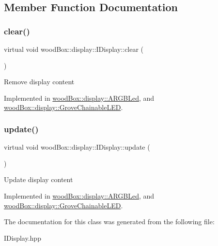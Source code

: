 \subsection{Member Function Documentation}
\mbox{\label{classwood_box_1_1display_1_1_i_display_a7030f0768c1ef15ce936a259406168dc}} 
\subsubsection{\texorpdfstring{clear()}{clear()}}
{\footnotesize\ttfamily virtual void wood\+Box\+::display\+::\+I\+Display\+::clear (\begin{DoxyParamCaption}{ }\end{DoxyParamCaption})\hspace{0.3cm}{\ttfamily [pure virtual]}}

Remove display content 

Implemented in \mbox{\hyperlink{classwood_box_1_1display_1_1_a_r_g_b_led_a01eeaee1bbb439e81f5f9bc536c04df7}{wood\+Box\+::display\+::\+A\+R\+G\+B\+Led}}, and \mbox{\hyperlink{classwood_box_1_1display_1_1_grove_chainable_l_e_d_a1c42c42ee9643aa914ab20a191e4adfd}{wood\+Box\+::display\+::\+Grove\+Chainable\+L\+ED}}.

\mbox{\label{classwood_box_1_1display_1_1_i_display_ad8c0811b8b807ce119a06c7806004de7}} 
\subsubsection{\texorpdfstring{update()}{update()}}
{\footnotesize\ttfamily virtual void wood\+Box\+::display\+::\+I\+Display\+::update (\begin{DoxyParamCaption}{ }\end{DoxyParamCaption})\hspace{0.3cm}{\ttfamily [pure virtual]}}

Update display content 

Implemented in \mbox{\hyperlink{classwood_box_1_1display_1_1_a_r_g_b_led_ab71f321d91e931f95b96d1f492a9454d}{wood\+Box\+::display\+::\+A\+R\+G\+B\+Led}}, and \mbox{\hyperlink{classwood_box_1_1display_1_1_grove_chainable_l_e_d_a650969665d0b5607465a63159c62e4ef}{wood\+Box\+::display\+::\+Grove\+Chainable\+L\+ED}}.



The documentation for this class was generated from the following file\+:\begin{DoxyCompactItemize}
\item 
I\+Display.\+hpp\end{DoxyCompactItemize}
